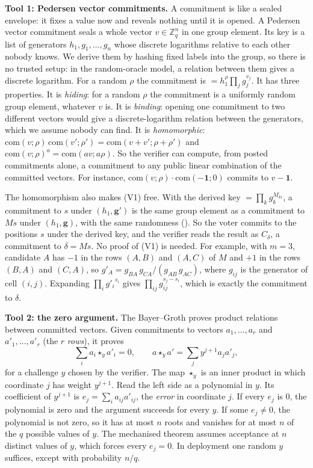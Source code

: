 \textbf{Tool 1: Pedersen vector commitments.} A commitment is like a
sealed envelope: it fixes a value now and reveals nothing until it is
opened. A Pedersen vector commitment seals a whole vector $v \in
\mathbb{Z}_q^n$ in one group element. Its key is a list of generators
$h_1, g_1, \ldots, g_n$ whose discrete logarithms relative to each other
nobody knows. We derive them by hashing fixed labels into the group, so
there is no trusted setup: in the random-oracle model, a relation between
them gives a discrete logarithm. For a random $\rho$ the commitment is
 $= h_1^{\rho} \prod_j g_j^{v_j}$. It has three properties. It is \emph{hiding}: for a random $\rho$ the
commitment is a uniformly random group element, whatever $v$ is. It is
\emph{binding}: opening one commitment to two different vectors would
give a discrete-logarithm relation between the generators, which we
assume nobody can find. It is \emph{homomorphic}:
$\mathrm{com}(v; \rho)\,\mathrm{com}(v'; \rho') = \mathrm{com}(v + v';
\rho + \rho')$ and $\mathrm{com}(v; \rho)^a = \mathrm{com}(a v; a\rho)$.
So the verifier can compute, from posted commitments alone, a commitment
to any public linear combination of the committed vectors. For instance,
$\mathrm{com}(v; \rho) \cdot \mathrm{com}(-\mathbf{1}; 0)$ commits to $v
- \mathbf{1}$.

The homomorphism also makes (V1) free. With the derived key
 $= \prod_k g_k^{M_{ki}}$, a commitment to $s$ under
$(h_1, \mathbf{g}')$ is the same group element as a commitment to $Ms$
under $(h_1, \mathbf{g})$, with the same randomness (). So
the voter commits to the positions $s$ under the derived key, and the
verifier reads the result as $C_\delta$, a commitment to $\delta = Ms$.
No proof of (V1) is needed. For example, with $m = 3$, candidate $A$ has
$-1$ in the rows $(A, B)$ and $(A, C)$ of $M$ and $+1$ in the rows $(B,
A)$ and $(C, A)$, so $g'_A = g_{BA}\, g_{CA} / (g_{AB}\, g_{AC})$, where
$g_{ij}$ is the generator of cell $(i, j)$. Expanding $\prod_i
{g'_i}^{s_i}$ gives $\prod_{ij} g_{ij}^{s_j - s_i}$, which is exactly the
commitment to $\delta$.

\textbf{Tool 2: the zero argument.} The Bayer--Groth
 proves product relations between
committed vectors. Given commitments to vectors $a_1, \ldots, a_r$ and
$a'_1, \ldots, a'_r$ (the $r$ \emph{rows}), it proves
\[
  \textstyle\sum_i a_i \star_y a'_i = 0,
  \qquad a \star_y a' = \sum_j y^{j+1} a_j a'_j,
\]
for a challenge $y$ chosen by the verifier. The map $\star_y$ is an inner
product in which coordinate $j$ has weight $y^{j+1}$. Read the left side
as a polynomial in $y$. Its coefficient of $y^{j+1}$ is $e_j = \sum_i
a_{ij} a'_{ij}$, the \emph{error} in coordinate $j$. If every $e_j$ is
$0$, the polynomial is zero and the argument succeeds for every $y$. If
some $e_j \ne 0$, the polynomial is not zero, so it has at most $n$
roots and vanishes for at most $n$ of the $q$ possible values of $y$. The
mechanised theorem assumes acceptance at $n$ distinct values of $y$,
which forces every $e_j = 0$. In deployment one random $y$ suffices,
except with probability $n/q$.

